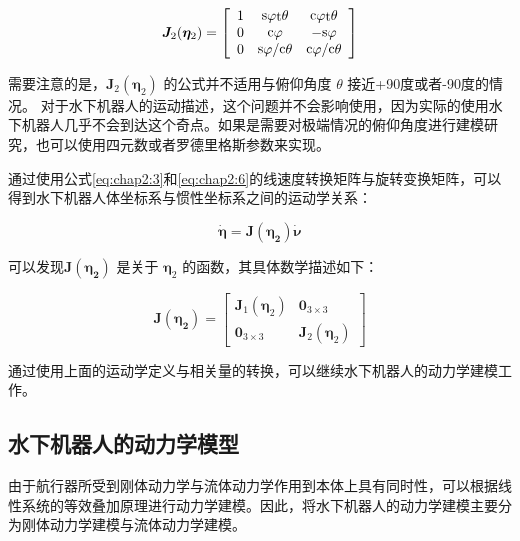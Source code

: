 \begin{equation*}
\centering
\label{eq:chap2:7}
{\bm{J}_2(\bm{\eta}_2)} =
 \left[ {\begin{array}{*{20}{c}}
   1 & {{\mathop{\rm s}\nolimits}  \varphi  {\mathop{\rm t}\nolimits}  \theta  } & {{\mathop{\rm c}\nolimits}  \varphi  {\mathop{\rm t}\nolimits}  \theta  }  \\
   0 & {{\mathop{\rm c}\nolimits}  \varphi  } & { - {\mathop{\rm s}\nolimits}  \varphi  }  \\
   0 & {{\mathop{\rm s}\nolimits}  \varphi  /{\mathop{\rm c}\nolimits}  \theta  } & {{\mathop{\rm c}\nolimits}  \varphi  /{\mathop{\rm c}\nolimits}  \theta  }  \\
\end{array}} \right]
\end{equation*}

需要注意的是，${\bm{J}_2(\bm{\eta}_2)}$ 的公式并不适用与俯仰角度 $\theta$ 接近+90度或者-90度的情况。 对于水下机器人的运动描述，这个问题并不会影响使用，因为实际的使用水下机器人几乎不会到达这个奇点。如果是需要对极端情况的俯仰角度进行建模研究，也可以使用四元数或者罗德里格斯参数来实现\cite{fossen1994guidance}。

通过使用公式\ref{eq:chap2:3}和\ref{eq:chap2:6}的线速度转换矩阵与旋转变换矩阵，可以得到水下机器人体坐标系与惯性坐标系之间的运动学关系：

\begin{equation}
\label{eq:chap2:8}
\dot{\bm{\eta}}= \bm{J(\bm{\eta}_2)}   \dot{\bm{\nu}}
\end{equation}

可以发现$\bm{J(\bm{\eta}_2)}$ 是关于 $\bm{\eta}_2$ 的函数，其具体数学描述如下：

\begin{equation}
\label{eq:chap2:9}
\bm{J(\bm{\eta}_2)} = \begin{bmatrix}
 {\bm{J}_1(\bm{\eta}_2)}  &   \bm{0}_{3 \times 3}\\
 \bm{0}_{3 \times 3}      &  {\bm{J}_2(\bm{\eta}_2)}
\end{bmatrix}
\end{equation}

通过使用上面的运动学定义与相关量的转换，可以继续水下机器人的动力学建模工作。

\subsection{水下机器人的动力学模型  }
由于航行器所受到刚体动力学与流体动力学作用到本体上具有同时性，可以根据线性系统的等效叠加原理进行动力学建模\cite{lamb1932hydrodynamics}。因此，将水下机器人的动力学建模主要分为刚体动力学建模与流体动力学建模。

